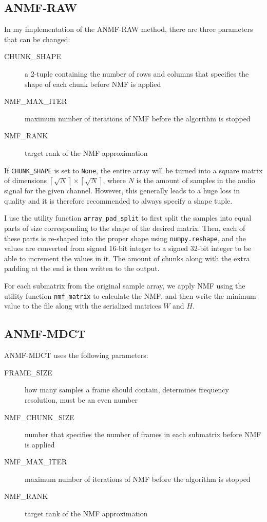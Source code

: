 \subsection{ANMF-RAW}
In my implementation of the ANMF-RAW method, there are three parameters that can be changed:

\begin{description}
	\item[CHUNK\_SHAPE] a 2-tuple containing the number of rows and columns that specifies the shape of each chunk before NMF is applied
	\item[NMF\_MAX\_ITER] maximum number of iterations of NMF before the algorithm is stopped
	\item[NMF\_RANK] target rank of the NMF approximation
\end{description}

If \verb|CHUNK_SHAPE| is set to \verb|None|, the entire array will be turned into a square matrix of dimensions $\left\lceil\sqrt{N}\right\rceil \times \left\lceil\sqrt{N}\right\rceil$, where $N$ is the amount of samples in the audio signal for the given channel. However, this generally leads to a huge loss in quality and it is therefore recommended to always specify a shape tuple.

I use the utility function \verb|array_pad_split| to first split the samples into equal parts of size corresponding to the shape of the desired matrix. Then, each of these parts is re-shaped into the proper shape using \verb|numpy.reshape|, and the values are converted from signed 16-bit integer to a signed 32-bit integer to be able to increment the values in it. The amount of chunks along with the extra padding at the end is then written to the output.

For each submatrix from the original sample array, we apply NMF using the utility function \verb|nmf_matrix| to calculate the NMF, and then write the minimum value to the file along with the serialized matrices $W$ and $H$.

\subsection{ANMF-MDCT}
ANMF-MDCT uses the following parameters:

\begin{description}
	\item[FRAME\_SIZE] how many samples a frame should contain, determines frequency resolution, must be an even number
	\item[NMF\_CHUNK\_SIZE] number that specifies the number of frames in each submatrix before NMF is applied
	\item[NMF\_MAX\_ITER] maximum number of iterations of NMF before the algorithm is stopped
	\item[NMF\_RANK] target rank of the NMF approximation
\end{description}

